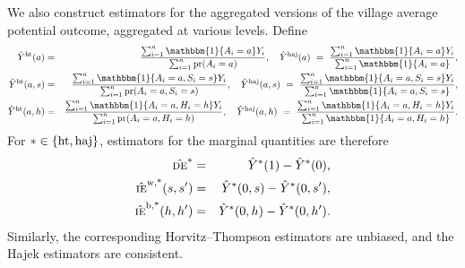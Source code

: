 \documentclass{article}
\newcommand{\pr}{\textup{pr}}
\newcommand{\indicator}{\mathbbm{1}}
\newcommand{\sumi}{\sum_{i=1}^n}
\newcommand{\de}{\textsc{de}}
\newcommand{\ie}{\textsc{ie}}
\newcommand{\horthom}{\textup{ht}}
\newcommand{\haj}{\textup{haj}}
\begin{document}
We also construct estimators for the aggregated versions of the village average potential outcome, aggregated at various levels. Define
\begin{eqnarray*}
    \hat{Y}^{\horthom}(a) &=& \frac{\sumi\indicator\{A_{i}=a\} Y_{i}}{\sumi\pr(A_{i}=a)}, \quad \hat{Y}^{\haj}(a) \ =\ \frac{\sumi\indicator\{A_{i}=a\} Y_{i}}{\sumi\indicator\{A_{i}=a\}}, \\
    \hat{Y}^{\horthom}(a,s) &=& \frac{\sumi\indicator\{A_{i}=a, S_{i}=s\} Y_{i}}{\sumi\pr(A_{i}=a, S_{i}=s)}, \quad \hat{Y}^{\haj}(a,s) \ =\  \frac{\sumi\indicator\{A_{i}=a, S_{i}=s\} Y_{i}}{\sumi\indicator\{A_{i}=a, S_{i}=s\}}, \\
    \hat{Y}^{\horthom}(a,h) &=& \frac{\sumi\indicator\{A_{i}=a, H_{i}=h\} Y_{i}}{\sumi\pr(A_{i}=a, H_{i}=h)}, \quad \hat{Y}^{\haj}(a,h) \ =\  \frac{\sumi\indicator\{A_{i}=a, H_{i}=h\} Y_{i}}{\sumi\indicator\{A_{i}=a, H_{i}=h\}}.
\end{eqnarray*}
For $*\in\{\horthom,\haj\}$, estimators for the marginal quantities are therefore
\begin{eqnarray*}
    \hat{\de}^{*} &=& \hat{Y}^{*}(1) - \hat{Y}^{*}(0), \\
    \hat{\ie}^{\textup{w,*}}(s,s^{\prime}) &=& \hat{Y}^{*}(0,s) - \hat{Y}^{*}(0,s^{\prime}), \\
    \hat{\ie}^{\textup{b,*}}(h,h^{\prime}) &=& \hat{Y}^{*}(0,h) - \hat{Y}^{*}(0,h^{\prime}).
\end{eqnarray*}
Similarly, the corresponding Horvitz--Thompson estimators are unbiased, and the Hajek estimators are consistent.

      
\end{document}
